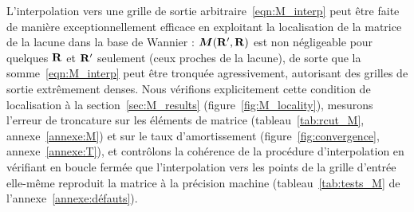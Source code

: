L'interpolation vers une grille de sortie arbitraire~\eqref{eqn:M_interp} peut être faite de manière exceptionnellement efficace en exploitant la localisation de la matrice de la lacune dans la base de Wannier : $\bm M(\mathbf{R}',\mathbf{R})$ est non négligeable pour quelques $\mathbf{R}$ et $\mathbf{R}'$ seulement (ceux proches de la lacune), de sorte que la somme~\eqref{eqn:M_interp} peut être tronquée agressivement, autorisant des grilles de sortie extrêmement denses. Nous vérifions explicitement cette condition de localisation à la section~\ref{sec:M_results} (figure~\ref{fig:M_locality}), mesurons l'erreur de troncature sur les éléments de matrice (tableau~\ref{tab:rcut_M}, annexe~\ref{annexe:M}) et sur le taux d'amortissement (figure~\ref{fig:convergence}, annexe~\ref{annexe:T}), et contrôlons la cohérence de la procédure d'interpolation en vérifiant en boucle fermée que l'interpolation vers les points de la grille d'entrée elle-même reproduit la matrice à la précision machine (tableau~\ref{tab:tests_M} de l'annexe~\ref{annexe:défauts}).

